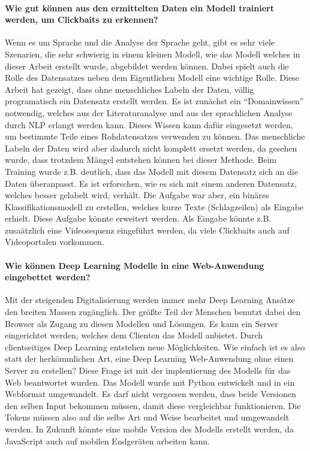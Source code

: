 \paragraph{Wie gut können aus den ermittelten Daten ein Modell trainiert werden, um Clickbaits zu erkennen?}
Wenn es um Sprache und die Analyse der Sprache geht, gibt es sehr viele Szenarien, die sehr schwierig in einem kleinen Modell, wie das Modell welches in dieser Arbeit erstellt wurde, abgebildet werden können. Dabei spielt auch die Rolle des Datensatzes neben dem Eigentlichen Modell eine wichtige Rolle. Diese Arbeit hat gezeigt, dass ohne menschliches Labeln der Daten, völlig programatisch ein Datensatz erstellt werden. Es ist zunächst ein \enquote{Domainwissen} notwendig, welches aus der Literaturanalyse und aus der sprachlichen Analyse durch NLP erlangt werden kann. Dieses Wissen kann dafür eingesetzt werden, um bestimmte Teile eines Rohdatensatzes verwenden zu können. Das menschliche Labeln der Daten wird aber dadurch nicht komplett ersetzt werden, da gesehen wurde, dass trotzdem Mängel entstehen können bei dieser Methode. Beim Training wurde z.B. deutlich, dass das Modell mit diesem Datensatz sich an die Daten überanpasst. Es ist erforschen, wie es sich mit einem anderen Datensatz, welches besser gelabelt wird, verhält. Die Aufgabe war aber, ein binäres Klassifikationsmodell zu erstellen, welches kurze Texte (Schlagzeilen) als Eingabe erhielt. Diese Aufgabe könnte erweitert werden. Als Eingabe könnte z.B. zusaätzlich eine Videosequenz eingeführt werden, da viele Clickbaits auch auf Videoportalen vorkommen.

\paragraph{Wie können Deep Learning Modelle in eine Web-Anwendung eingebettet werden?}

Mit der steigenden Digitalisierung werden immer mehr Deep Learning Ansätze den breiten Massen zugänglich. Der größte Teil der Menschen benutzt dabei den Browser als Zugang zu diesen Modellen und Lösungen. Es kann ein Server eingerichtet werden, welches dem Clienten das Modell anbietet. Durch clientseitiges Deep Learning entstehen neue Möglichkeiten. Wie einfach ist es also statt der herkömmlichen Art, eine Deep Learning Web-Anwendung ohne einen Server zu erstellen? Diese Frage ist mit der implentierung des Modells für das Web beantwortet wurden. Das Modell wurde mit Python entwickelt und in ein Webformat umgewandelt. Es darf nicht vergessen werden, dass beide Versionen den selben Input bekommen müssen, damit diese vergleichbar funktionieren. Die Tokens müssen also auf die selbe Art und Weise bearbeitet und umgewandelt werden. In Zukunft könnte eine mobile Version des Modells erstellt werden, da JavaScript auch auf mobilen Endgeräten arbeiten kann. 




